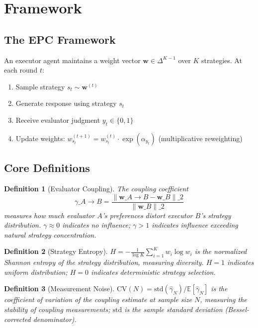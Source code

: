 \documentclass[11pt]{article}
\newtheorem{definition}{Definition}
\begin{document}
\section{Framework}

\subsection{The EPC Framework}

An executor agent maintains a weight vector $\mathbf{w} \in \Delta^{K-1}$ over $K$ strategies. At each round $t$:
\begin{enumerate}[leftmargin=*,nosep]
 \item Sample strategy $s_t \sim \mathbf{w}^{(t)}$
 \item Generate response using strategy $s_t$
 \item Receive evaluator judgment $y_t \in \{0, 1\}$
 \item Update weights: $w_{s_t}^{(t+1)} = w_{s_t}^{(t)} \cdot \exp(\alpha_{y_t})$ (multiplicative reweighting)
\end{enumerate}

\subsection{Core Definitions}

\begin{definition}[Evaluator Coupling]
The coupling coefficient
\[
\gamma\_{A \to B} =
\frac{\|\mathbf{w}\_{A \to B} - \mathbf{w}\_B\|\_2}{\|\mathbf{w}\_B\|\_2}
\]
measures how much evaluator $A$'s preferences distort executor $B$'s strategy distribution. $\gamma \approx 0$ indicates no influence; $\gamma > 1$ indicates influence exceeding natural strategy concentration.
\end{definition}

\begin{definition}[Strategy Entropy]
$H = -\frac{1}{\log K}\sum_{i=1}^K w_i \log w_i$ is the normalized Shannon entropy of the strategy distribution, measuring diversity. $H = 1$ indicates uniform distribution; $H = 0$ indicates deterministic strategy selection.
\end{definition}

\begin{definition}[Measurement Noise]
$\mathrm{CV}(N) = \text{std}(\hat{\gamma}_N) / \mathbb{E}[\hat{\gamma}_N]$ is the coefficient of variation of the coupling estimate at sample size $N$, measuring the stability of coupling measurements; $\text{std}$ is the sample standard deviation (Bessel-corrected denominator).
\end{definition}
\end{document}

